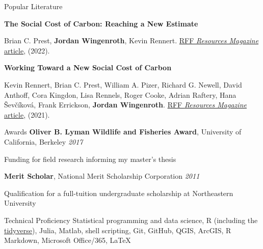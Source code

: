 \documentclass{resume} %
\begin{document}
\begin{rSection}{Popular Literature}

{\bf The Social Cost of Carbon: Reaching a New Estimate}
\vspace{-7pt}
\begin{adjustwidth}{12pt}{}
{\small Brian C. Prest, \textbf{Jordan Wingenroth}, Kevin Rennert. \href{https://www.resources.org/archives/the-social-cost-of-carbon-reaching-a-new-estimate/}{RFF \textit{Resources Magazine} article}, (2022).}
\end{adjustwidth}

{\bf Working Toward a New Social Cost of Carbon}
\vspace{-7pt}
\begin{adjustwidth}{12pt}{}
{\small Kevin Rennert, Brian C. Prest, William A. Pizer, Richard G. Newell, David Anthoff, Cora Kingdon, Lisa Rennels, Roger Cooke, Adrian Raftery, Hana \v{S}ev\v{c}\'{i}kov\'{a}, Frank Errickson, \textbf{Jordan Wingenroth}. \href{https://www.resources.org/archives/working-toward-a-new-social-cost-of-carbon/}{RFF \textit{Resources Magazine} article}, (2021).}
\end{adjustwidth}

\end{rSection}


\begin{rSection}{Awards} 
{\bf Oliver B. Lyman Wildlife and Fisheries Award}{, University of California, Berkeley
} \hfill{\em 2017}
\vspace{-7pt}
\begin{adjustwidth}{12pt}{}
{\small Funding for field research informing my master's thesis}
\end{adjustwidth}
{\bf Merit Scholar}{, National Merit Scholarship Corporation
} \hfill{\em 2011}
\vspace{-7pt}
\begin{adjustwidth}{12pt}{}
{\small Qualification for a full-tuition undergraduate scholarship at Northeastern University}
\end{adjustwidth}

\end{rSection}


\begin{rSection}{Technical Proficiency}
{Statistical programming and data science, R (including the \href{https://www.tidyverse.org}{tidyverse}), Julia, Matlab, shell scripting, Git, GitHub, QGIS, ArcGIS, R Markdown,  Microsoft Office/365, \LaTeX}\\
\end{rSection}
\end{document}
